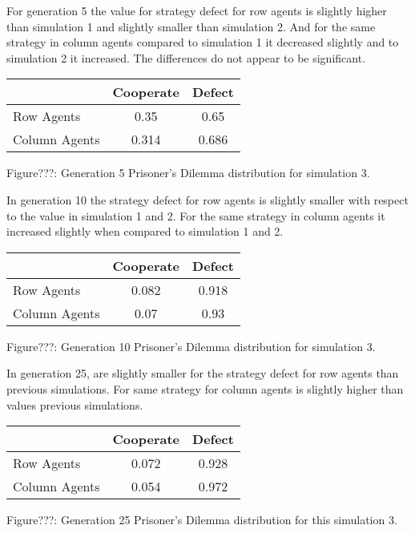 \documentclass{article}
\begin{document}
 For generation 5 the value for strategy defect for row agents is slightly higher than simulation 1 and slightly smaller than simulation 2. And for the same strategy in column agents compared to simulation 1 it decreased slightly and to simulation 2 it increased. The differences do not appear to be significant.
\begin{center}
\begin{tabular}{|l|c|c|}
\hline
& Cooperate & Defect \\ 
\hline
Row Agents & 0.35 & 0.65\\
\hline
Column Agents & 0.314 & 0.686\\
\hline
\end{tabular}
\end{center}
\begin{center}
Figure???: Generation 5 Prisoner’s Dilemma distribution for simulation 3.
\end{center}

In generation 10 the strategy defect for row agents is slightly smaller with respect to the value in simulation 1 and 2. For the same strategy in column agents it increased slightly when compared to simulation 1 and 2.
\begin{center}
\begin{tabular}{|l|c|c|}
\hline
& Cooperate & Defect \\ 
\hline
Row Agents & 0.082 & 0.918\\
\hline
Column Agents & 0.07 & 0.93\\
\hline
\end{tabular}
\end{center}
\begin{center}
Figure???: Generation 10 Prisoner’s Dilemma distribution for simulation 3.
\end{center}

In generation 25, are slightly smaller for the strategy defect for row agents than previous simulations. For same strategy for column agents is slightly higher than values previous simulations.
\begin{center}
\begin{tabular}{|l|c|c|}
\hline
& Cooperate & Defect \\ 
\hline
Row Agents & 0.072 & 0.928\\
\hline
Column Agents & 0.054 & 0.972\\
\hline
\end{tabular}
\end{center}
\begin{center}
Figure???: Generation 25 Prisoner’s Dilemma distribution for this simulation 3.
\end{center}
\end{document}
